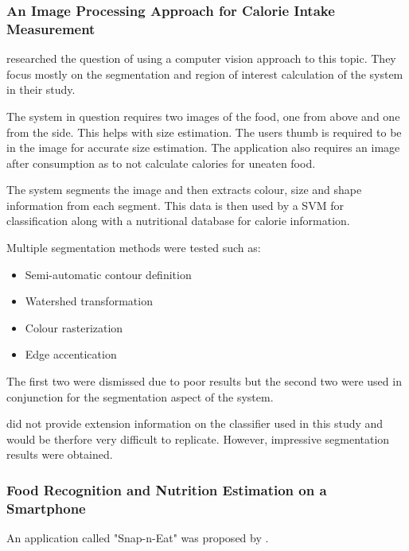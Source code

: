 
\subsubsection*{An Image Processing Approach for Calorie Intake Measurement}
\parencite{villalobos2012image} researched the question of using a computer vision approach to this topic. They focus mostly on the segmentation and region of interest calculation of the system in their study.

The system in question requires two images of the food, one from above and one from the side. This helps with size estimation. The users thumb is required to be in the image for accurate size estimation. The application also requires an image after consumption as to not calculate calories for uneaten food.

The system segments the image and then extracts colour, size and shape information from each segment. This data is then used by a SVM for classification along with a nutritional database for calorie information. 

Multiple segmentation methods were tested such as:
\begin{itemize}
	\item{Semi-automatic contour definition}
	\item{Watershed transformation}
	\item{Colour rasterization}
	\item{Edge accentication}
\end{itemize}
The first two were dismissed due to poor results but the second two were used in conjunction for the segmentation aspect of the system.

\parencite{villalobos2012image} did not provide extension information on the classifier used in this study and would be therfore very difficult to replicate.
However, impressive segmentation results were obtained.

\subsubsection*{Food Recognition and Nutrition Estimation on a Smartphone}
An application called "Snap-n-Eat" was proposed by \parencite{snap}.

